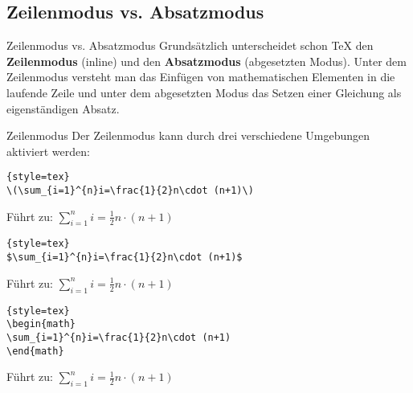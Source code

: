 \subsection{Zeilenmodus vs. Absatzmodus}
\begin{frame}[fragile]{Zeilenmodus vs. Absatzmodus}	
Grundsätzlich unterscheidet schon \TeX{} den \textbf{Zeilenmodus} (inline) und den \textbf{Absatzmodus} (abgesetzten Modus). Unter dem Zeilenmodus versteht man das Einfügen von mathematischen Elementen in die laufende Zeile und unter dem abgesetzten Modus das Setzen einer Gleichung als eigenständigen Absatz.



\end{frame}

\begin{frame}[fragile]{Zeilenmodus}
Der Zeilenmodus kann durch drei verschiedene Umgebungen aktiviert werden:
\begin{lstlisting}[mathescape=true]{style=tex}
\(\sum_{i=1}^{n}i=\frac{1}{2}n\cdot (n+1)\)
\end{lstlisting}
Führt zu: \(\sum_{i=1}^{n}i=\frac{1}{2}n\cdot (n+1)\)
\begin{lstlisting}[mathescape=false]{style=tex}
$\sum_{i=1}^{n}i=\frac{1}{2}n\cdot (n+1)$
\end{lstlisting}
Führt zu: $\sum_{i=1}^{n}i=\frac{1}{2}n\cdot (n+1)$
\begin{lstlisting}[mathescape=false]{style=tex}
\begin{math}
\sum_{i=1}^{n}i=\frac{1}{2}n\cdot (n+1)
\end{math}
\end{lstlisting}
Führt zu:
\begin{math}
\sum_{i=1}^{n}i=\frac{1}{2}n\cdot (n+1)
\end{math}
\end{frame}

